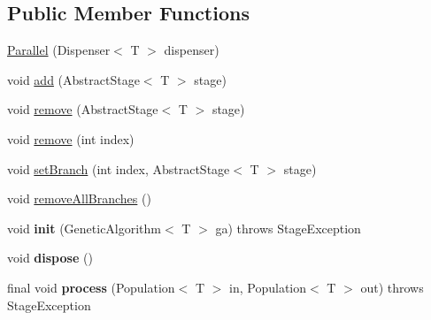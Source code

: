 \subsection*{Public Member Functions}
\begin{DoxyCompactItemize}
\item 
\hyperlink{classjenes_1_1stage_1_1_parallel_3_01_t_01extends_01_chromosome_01_4_a933c7a845f624f290f27c9921e6e8ca9}{Parallel} (Dispenser$<$ T $>$ dispenser)
\item 
void \hyperlink{classjenes_1_1stage_1_1_parallel_3_01_t_01extends_01_chromosome_01_4_afe3cf6bd36f7e0f7246cbf609d9cbdf2}{add} (Abstract\-Stage$<$ T $>$ stage)
\item 
void \hyperlink{classjenes_1_1stage_1_1_parallel_3_01_t_01extends_01_chromosome_01_4_adb15ae336a8829eb0a8f984eb7aac3ca}{remove} (Abstract\-Stage$<$ T $>$ stage)
\item 
void \hyperlink{classjenes_1_1stage_1_1_parallel_3_01_t_01extends_01_chromosome_01_4_acf777ee17edc34cb81d2d0fc145cffc4}{remove} (int index)
\item 
void \hyperlink{classjenes_1_1stage_1_1_parallel_3_01_t_01extends_01_chromosome_01_4_a115d20da27789c0a053ed7e161838477}{set\-Branch} (int index, Abstract\-Stage$<$ T $>$ stage)
\item 
void \hyperlink{classjenes_1_1stage_1_1_parallel_3_01_t_01extends_01_chromosome_01_4_acc2efb924520eb73061928e39580202c}{remove\-All\-Branches} ()
\item 
\hypertarget{classjenes_1_1stage_1_1_parallel_3_01_t_01extends_01_chromosome_01_4_a75d99b7406d735b297e6192b2ac130e9}{void {\bfseries init} (Genetic\-Algorithm$<$ T $>$ ga)  throws Stage\-Exception }\label{classjenes_1_1stage_1_1_parallel_3_01_t_01extends_01_chromosome_01_4_a75d99b7406d735b297e6192b2ac130e9}

\item 
\hypertarget{classjenes_1_1stage_1_1_parallel_3_01_t_01extends_01_chromosome_01_4_a67831e08edd3b98bf0d81778cf067aeb}{void {\bfseries dispose} ()}\label{classjenes_1_1stage_1_1_parallel_3_01_t_01extends_01_chromosome_01_4_a67831e08edd3b98bf0d81778cf067aeb}

\item 
\hypertarget{classjenes_1_1stage_1_1_parallel_3_01_t_01extends_01_chromosome_01_4_a504ed9a0dddbfd46a9bebd4a38dba964}{final void {\bfseries process} (Population$<$ T $>$ in, Population$<$ T $>$ out)  throws Stage\-Exception }\label{classjenes_1_1stage_1_1_parallel_3_01_t_01extends_01_chromosome_01_4_a504ed9a0dddbfd46a9bebd4a38dba964}


\end{DoxyCompactItemize}
